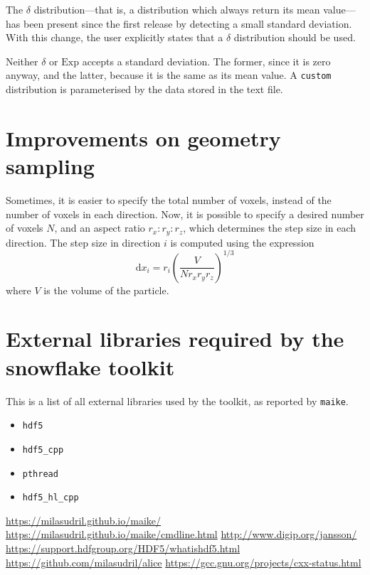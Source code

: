 \documentclass[a4paper,10pt]{scrartcl}
\newcommand{\prgname}[1]{\texttt{#1}}
\newcommand{\dd}{\mathrm{d}}
\begin{document}
The $\delta$ distribution---that is, a distribution which always return its mean value---has been present since the first release by detecting a small standard deviation. With this change, the user explicitly states that a $\delta$ distribution should be used.

Neither $\delta$ or $\text{Exp}$ accepts a standard deviation. The former, since it is zero anyway, and the latter, because it is the same as its mean value. A \texttt{custom} distribution is parameterised by the data stored in the text file.


\section{Improvements on geometry sampling}
Sometimes, it is easier to specify the total number of voxels, instead of the number of voxels in each direction. Now, it is possible to specify a desired number of voxels $N$, and an aspect ratio $r_x:r_y:r_z$, which determines the step size in each direction. The step size in direction $i$ is computed using the expression
\[
 \dd x_i = r_i \left(\frac{V}{N r_x r_y r_z}\right)^{1/3}
\]
where $V$ is the volume of the particle.

\appendix

\section{External libraries required by the snowflake toolkit}
\label{deps}
This is a list of all external libraries used by the toolkit, as reported by \prgname{maike}.

\begin{itemize}
 \item \texttt{hdf5}
 \item \texttt{hdf5\_cpp}
 \item \texttt{pthread}
 \item \texttt{hdf5\_hl\_cpp}
 \end{itemize}
 

\begin{thebibliography}{9}
 \url{https://milasudril.github.io/maike/}
 \url{https://milasudril.github.io/maike/cmdline.html}
 \url{http://www.digip.org/jansson/}
 \url{https://support.hdfgroup.org/HDF5/whatishdf5.html}
 \url{https://github.com/milasudril/alice}
 \url{https://gcc.gnu.org/projects/cxx-status.html}
\end{thebibliography}
\end{document}
